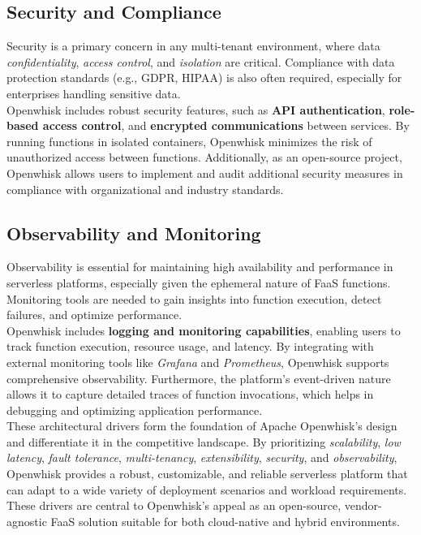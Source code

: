 \subsection{Security and Compliance}
Security is a primary concern in any multi-tenant environment, where data \textit{confidentiality}, \textit{access control}, and \textit{isolation} are critical. Compliance with data protection standards (e.g., GDPR, HIPAA) is also often required, especially for enterprises handling sensitive data.\vspace{14pt}\\
Openwhisk includes robust security features, such as \textbf{API authentication}, \textbf{role-based access control}, and \textbf{encrypted communications} between services. By running functions in isolated containers, Openwhisk minimizes the risk of unauthorized access between functions. Additionally, as an open-source project, Openwhisk allows users to implement and audit additional security measures in compliance with organizational and industry standards.
\subsection{Observability and Monitoring}
Observability is essential for maintaining high availability and performance in serverless platforms, especially given the ephemeral nature of FaaS functions. Monitoring tools are needed to gain insights into function execution, detect failures, and optimize performance.\vspace{14pt}\\
Openwhisk includes \textbf{logging and monitoring capabilities}, enabling users to track function execution, resource usage, and latency. By integrating with external monitoring tools like \textit{Grafana} and \textit{Prometheus}, Openwhisk supports comprehensive observability. Furthermore, the platform’s event-driven nature allows it to capture detailed traces of function invocations, which helps in debugging and optimizing application performance.
\vspace{30pt}\\
These architectural drivers form the foundation of Apache Openwhisk’s design and differentiate it in the competitive landscape. By prioritizing \textit{scalability}, \textit{low latency}, \textit{fault tolerance}, \textit{multi-tenancy}, \textit{extensibility}, \textit{security}, and \textit{observability}, Openwhisk provides a robust, customizable, and reliable serverless platform that can adapt to a wide variety of deployment scenarios and workload requirements.\vspace{14pt}\\
These drivers are central to Openwhisk’s appeal as an open-source, vendor-agnostic FaaS solution suitable for both cloud-native and hybrid environments.